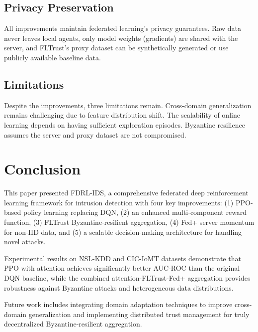 \documentclass[conference]{IEEEtran}
\begin{document}
\subsection{Privacy Preservation}

All improvements maintain federated learning's privacy guarantees. Raw data never leaves local agents, only model weights (gradients) are shared with the server, and FLTrust's proxy dataset can be synthetically generated or use publicly available baseline data.

\subsection{Limitations}

Despite the improvements, three limitations remain. Cross-domain generalization remains challenging due to feature distribution shift. The scalability of online learning depends on having sufficient exploration episodes. Byzantine resilience assumes the server and proxy dataset are not compromised.

\section{Conclusion}

This paper presented FDRL-IDS, a comprehensive federated deep reinforcement learning framework for intrusion detection with four key improvements: (1) PPO-based policy learning replacing DQN, (2) an enhanced multi-component reward function, (3) FLTrust Byzantine-resilient aggregation, (4) Fed+ server momentum for non-IID data, and (5) a scalable decision-making architecture for handling novel attacks.

Experimental results on NSL-KDD and CIC-IoMT datasets demonstrate that PPO with attention achieves significantly better AUC-ROC than the original DQN baseline, while the combined attention-FLTrust-Fed+ aggregation provides robustness against Byzantine attacks and heterogeneous data distributions.

Future work includes integrating domain adaptation techniques to improve cross-domain generalization and implementing distributed trust management for truly decentralized Byzantine-resilient aggregation.

\end{document}
